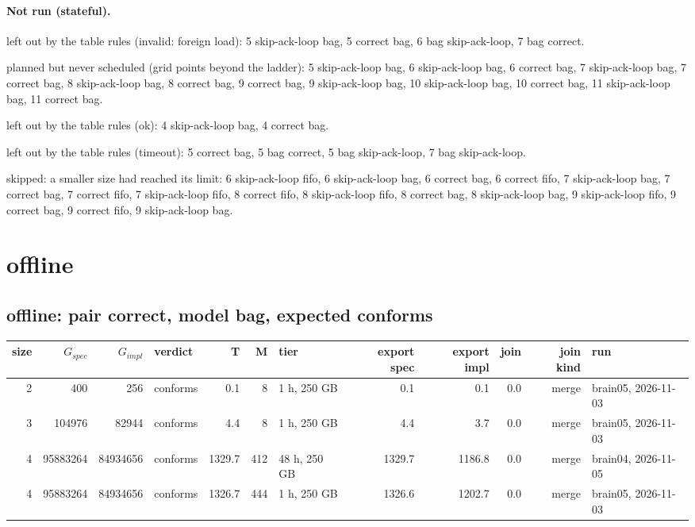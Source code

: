 \documentclass[10pt]{article}
\begin{document}
\paragraph{Not run (stateful).}
left out by the table rules (invalid: foreign load): 5 skip-ack-loop bag, 5 correct bag, 6 bag skip-ack-loop, 7 bag correct.\par
planned but never scheduled (grid points beyond the ladder): 5 skip-ack-loop bag, 6 skip-ack-loop bag, 6 correct bag, 7 skip-ack-loop bag, 7 correct bag, 8 skip-ack-loop bag, 8 correct bag, 9 correct bag, 9 skip-ack-loop bag, 10 skip-ack-loop bag, 10 correct bag, 11 skip-ack-loop bag, 11 correct bag.\par
left out by the table rules (ok): 4 skip-ack-loop bag, 4 correct bag.\par
left out by the table rules (timeout): 5 correct bag, 5 bag correct, 5 bag skip-ack-loop, 7 bag skip-ack-loop.\par
skipped: a smaller size had reached its limit: 6 skip-ack-loop fifo, 6 skip-ack-loop bag, 6 correct bag, 6 correct fifo, 7 skip-ack-loop bag, 7 correct bag, 7 correct fifo, 7 skip-ack-loop fifo, 8 correct fifo, 8 skip-ack-loop fifo, 8 correct bag, 8 skip-ack-loop bag, 9 skip-ack-loop fifo, 9 correct bag, 9 correct fifo, 9 skip-ack-loop bag.\par
\section*{offline}
\subsection*{offline: pair \textsf{correct}, model bag, expected conforms}
\begin{longtable}{@{}rrrlrrlrrrrl@{}}
\toprule
size & $G_{\mathit{spec}}$ & $G_{\mathit{impl}}$ & verdict & T & M & tier & export spec & export impl & join & join kind & run \\
\midrule
\endhead
\color{blue} 2 & 400 & 256 & conforms & 0.1 & 8 & 1 h, 250 GB & 0.1 & 0.1 & 0.0 & merge & brain05, 2026-11-03 \\
\color{blue} 3 & 104976 & 82944 & conforms & 4.4 & 8 & 1 h, 250 GB & 4.4 & 3.7 & 0.0 & merge & brain05, 2026-11-03 \\
\color{blue} 4 & 95883264 & 84934656 & conforms & 1329.7 & 412 & 48 h, 250 GB & 1329.7 & 1186.8 & 0.0 & merge & brain04, 2026-11-05 \\
\color{blue} 4 & 95883264 & 84934656 & conforms & 1326.7 & 444 & 1 h, 250 GB & 1326.6 & 1202.7 & 0.0 & merge & brain05, 2026-11-03 \\
\bottomrule
\end{longtable}
\end{document}

